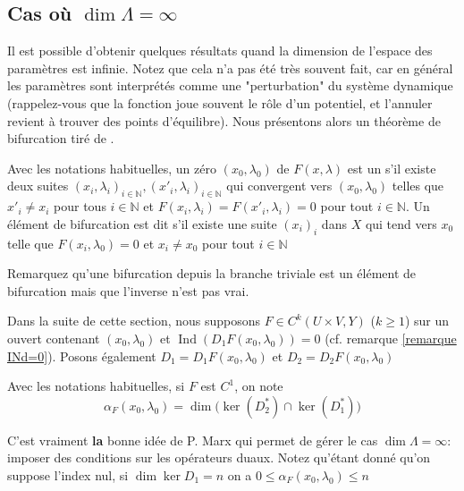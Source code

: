 \documentclass[memoire.tex]{subfiles}
\begin{document}
\subsection{Cas où $\dim \Lambda=\infty$}\label{Lambdainfdim}
Il est possible d'obtenir quelques résultats quand la dimension de l'espace des paramètres est infinie. Notez que cela n'a pas été très souvent fait, car en général les paramètres sont interprétés comme une "perturbation" du système dynamique (rappelez-vous que la fonction joue souvent le rôle d'un potentiel,  et l'annuler revient à trouver des points d'équilibre). Nous présentons alors un théorème de bifurcation tiré de \cite{Marx1994Bifurcation}.

\begin{definition}
    Avec les notations habituelles, un zéro $(x_0,\lambda_0)$ de $F(x,\lambda)$ est un   s'il existe deux suites $(x_i,\lambda_i)_{i\in\mathbb{N}},(x'_i,\lambda_i)_{i\in\mathbb{N}}$ qui convergent vers $(x_0,\lambda_0)$ telles que $x'_i\neq x_i$ pour tous $i\in\mathbb{N}$ et 
    $F(x_i,\lambda_i)=F(x'_i,\lambda_i)=0$ pour tout $i\in\mathbb{N}$. Un élément de bifurcation est dit  s'il existe une suite $(x_i)_i$ dans $X$ qui tend vers $x_0$ telle que $F(x_i,\lambda_0)=0$ et $x_i\neq x_0$ pour tout $i\in\mathbb{N}$
\end{definition}
\begin{remarque}
    Remarquez qu'une bifurcation depuis la branche triviale est un élément de bifurcation mais que l'inverse n'est pas vrai.
\end{remarque}
Dans la suite de cette section, nous supposons $F\in C^k (U\times V,Y)$ ($k\geq 1$) sur un ouvert contenant $(x_0,\lambda_0)$ et  $\operatorname{Ind}(D_1F(x_0,\lambda_0))=0$ (cf. remarque \ref{remarque INd=0}). Posons également $D_1=D_1F(x_0,\lambda_0)$ et $D_2=D_2F(x_0,\lambda_0)$

\begin{definition}
    Avec les notations habituelles, si $F$ est $C^1$, on note 
    \begin{equation*}
        \alpha_{F}(x_0,\lambda_0)= \dim \big(\ker (D_2^{*})\cap \ker (D_1^{*})\big)
    \end{equation*}
\end{definition} 
C'est vraiment \textbf{la} bonne idée de P. Marx qui permet de gérer le cas $\dim \Lambda =\infty $: imposer des conditions sur les opérateurs duaux.
Notez qu'étant donné qu'on suppose l'index nul, si  $\dim \ker D_1=n$ on a $0\leq \alpha_F(x_0,\lambda_0)\leq n$
\end{document}
